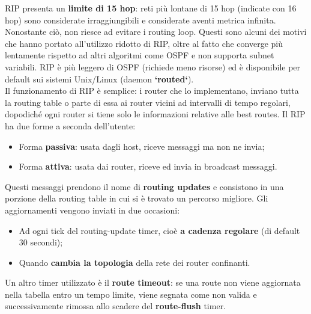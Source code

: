 \documentclass{article}
\begin{document}
        RIP presenta un \textbf{limite di 15 hop}: reti più lontane di 15 hop (indicate con 16 hop) sono
        considerate irraggiungibili e considerate aventi metrica infinita. Nonostante ciò, non riesce ad
        evitare i routing loop. Questi sono alcuni dei motivi che hanno portato all’utilizzo ridotto di RIP,
        oltre al fatto che converge più lentamente rispetto ad altri algoritmi come OSPF e non supporta
        subnet variabili. RIP è più leggero di OSPF (richiede meno risorse) ed è disponibile per default
        sui sistemi Unix/Linux (daemon \textbf{`routed`}).\\
        
        Il funzionamento di RIP è semplice: i router che lo implementano, inviano tutta la routing table
        o parte di essa ai router vicini ad intervalli di tempo regolari, dopodiché ogni router si tiene
        solo le informazioni relative alle best routes. Il RIP ha due forme a seconda dell’utente:\\
        
            \begin{itemize}
                \item Forma \textbf{passiva}: usata dagli host, riceve messaggi ma non ne invia;
                \item Forma \textbf{attiva}: usata dai router, riceve ed invia in broadcast messaggi.
            \end{itemize}
        
        Questi messaggi prendono il nome di \textbf{routing updates} e consistono in una porzione della
        routing table in cui si è trovato un percorso migliore. Gli aggiornamenti vengono inviati in due
        occasioni:
        
            \begin{itemize}
                \item Ad ogni tick del routing-update timer, cioè \textbf{a cadenza regolare} (di default 30 secondi);
                \item Quando \textbf{cambia la topologia} della rete dei router confinanti.
            \end{itemize}
            
        Un altro timer utilizzato è il \textbf{route timeout}: se una route non viene aggiornata nella tabella
        entro un tempo limite, viene segnata come non valida e successivamente rimossa allo scadere
        del \textbf{route-flush} timer.\\
\end{document}
